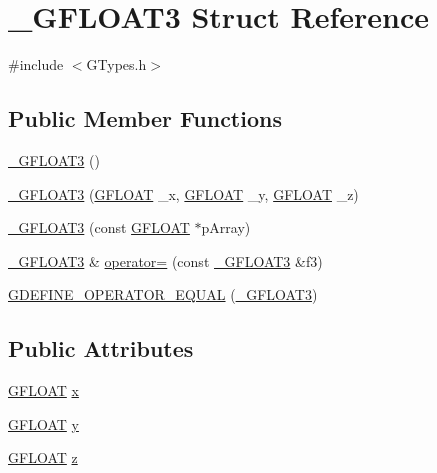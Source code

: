 \hypertarget{struct___g_f_l_o_a_t3}{}\section{\+\_\+\+G\+F\+L\+O\+A\+T3 Struct Reference}
\label{struct___g_f_l_o_a_t3}


{\ttfamily \#include $<$G\+Types.\+h$>$}

\subsection*{Public Member Functions}
\begin{DoxyCompactItemize}
\item 
\hyperlink{struct___g_f_l_o_a_t3_ae1c10e4c96dbd988b97b0700b970c30d}{\+\_\+\+G\+F\+L\+O\+A\+T3} ()
\item 
\hyperlink{struct___g_f_l_o_a_t3_abfcac63931f37b54d9f32db3abb57734}{\+\_\+\+G\+F\+L\+O\+A\+T3} (\hyperlink{_g_types_8h_abf6eba8223df62f199b811a6c52ff2ef}{G\+F\+L\+O\+A\+T} \+\_\+x, \hyperlink{_g_types_8h_abf6eba8223df62f199b811a6c52ff2ef}{G\+F\+L\+O\+A\+T} \+\_\+y, \hyperlink{_g_types_8h_abf6eba8223df62f199b811a6c52ff2ef}{G\+F\+L\+O\+A\+T} \+\_\+z)
\item 
\hyperlink{struct___g_f_l_o_a_t3_a064657c5889c178a8e6622d437054b43}{\+\_\+\+G\+F\+L\+O\+A\+T3} (const \hyperlink{_g_types_8h_abf6eba8223df62f199b811a6c52ff2ef}{G\+F\+L\+O\+A\+T} $\ast$p\+Array)
\item 
\hyperlink{struct___g_f_l_o_a_t3}{\+\_\+\+G\+F\+L\+O\+A\+T3} \& \hyperlink{struct___g_f_l_o_a_t3_adf3d35350e1a824c7ce32669df132c1e}{operator=} (const \hyperlink{struct___g_f_l_o_a_t3}{\+\_\+\+G\+F\+L\+O\+A\+T3} \&f3)
\item 
\hyperlink{struct___g_f_l_o_a_t3_a99862e64f11daaf21ad7a6900914a3ac}{G\+D\+E\+F\+I\+N\+E\+\_\+\+O\+P\+E\+R\+A\+T\+O\+R\+\_\+\+E\+Q\+U\+A\+L} (\hyperlink{struct___g_f_l_o_a_t3}{\+\_\+\+G\+F\+L\+O\+A\+T3})
\end{DoxyCompactItemize}
\subsection*{Public Attributes}
\begin{DoxyCompactItemize}
\item 
\hyperlink{_g_types_8h_abf6eba8223df62f199b811a6c52ff2ef}{G\+F\+L\+O\+A\+T} \hyperlink{struct___g_f_l_o_a_t3_a349b9fa6c098aafd537c7e74b1e1696e}{x}
\item 
\hyperlink{_g_types_8h_abf6eba8223df62f199b811a6c52ff2ef}{G\+F\+L\+O\+A\+T} \hyperlink{struct___g_f_l_o_a_t3_ac79b15fa423c67141dcb1ef2178bb308}{y}
\item 
\hyperlink{_g_types_8h_abf6eba8223df62f199b811a6c52ff2ef}{G\+F\+L\+O\+A\+T} \hyperlink{struct___g_f_l_o_a_t3_a1e8890af618a74c458e2685b333bd577}{z}
\end{DoxyCompactItemize}


